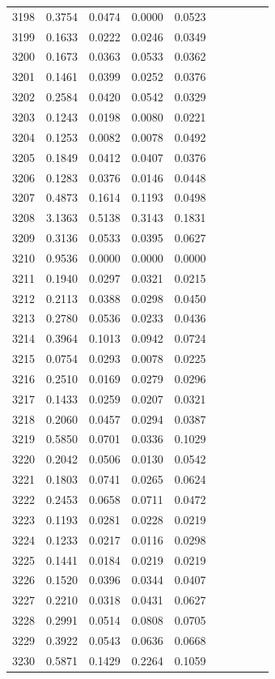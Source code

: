\begin{table}
\begin{tabular}{cccccccccc}
3198& 0.3754& 0.0474& 0.0000& 0.0523\\ 
3199& 0.1633& 0.0222& 0.0246& 0.0349\\ 
3200& 0.1673& 0.0363& 0.0533& 0.0362\\ 
3201& 0.1461& 0.0399& 0.0252& 0.0376\\ 
3202& 0.2584& 0.0420& 0.0542& 0.0329\\ 
3203& 0.1243& 0.0198& 0.0080& 0.0221\\ 
3204& 0.1253& 0.0082& 0.0078& 0.0492\\ 
3205& 0.1849& 0.0412& 0.0407& 0.0376\\ 
3206& 0.1283& 0.0376& 0.0146& 0.0448\\ 
3207& 0.4873& 0.1614& 0.1193& 0.0498\\ 
3208& 3.1363& 0.5138& 0.3143& 0.1831\\ 
3209& 0.3136& 0.0533& 0.0395& 0.0627\\ 
3210& 0.9536& 0.0000& 0.0000& 0.0000\\ 
3211& 0.1940& 0.0297& 0.0321& 0.0215\\ 
3212& 0.2113& 0.0388& 0.0298& 0.0450\\ 
3213& 0.2780& 0.0536& 0.0233& 0.0436\\ 
3214& 0.3964& 0.1013& 0.0942& 0.0724\\ 
3215& 0.0754& 0.0293& 0.0078& 0.0225\\ 
3216& 0.2510& 0.0169& 0.0279& 0.0296\\ 
3217& 0.1433& 0.0259& 0.0207& 0.0321\\ 
3218& 0.2060& 0.0457& 0.0294& 0.0387\\ 
3219& 0.5850& 0.0701& 0.0336& 0.1029\\ 
3220& 0.2042& 0.0506& 0.0130& 0.0542\\ 
3221& 0.1803& 0.0741& 0.0265& 0.0624\\ 
3222& 0.2453& 0.0658& 0.0711& 0.0472\\ 
3223& 0.1193& 0.0281& 0.0228& 0.0219\\ 
3224& 0.1233& 0.0217& 0.0116& 0.0298\\ 
3225& 0.1441& 0.0184& 0.0219& 0.0219\\ 
3226& 0.1520& 0.0396& 0.0344& 0.0407\\ 
3227& 0.2210& 0.0318& 0.0431& 0.0627\\ 
3228& 0.2991& 0.0514& 0.0808& 0.0705\\ 
3229& 0.3922& 0.0543& 0.0636& 0.0668\\ 
3230& 0.5871& 0.1429& 0.2264& 0.1059\\ 

\end{tabular}
\end{table}
